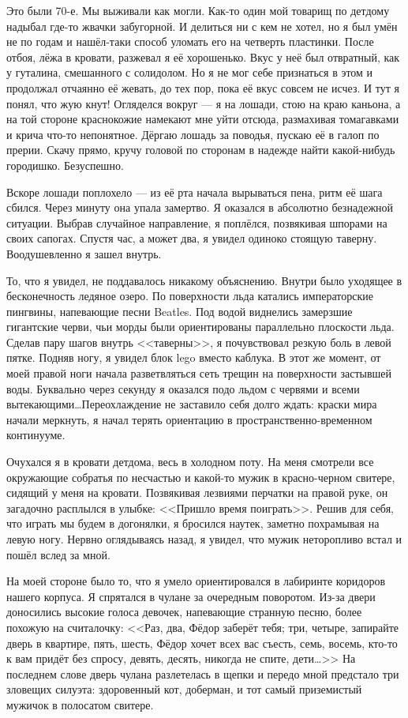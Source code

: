 Это были 70-е. Мы выживали как могли. Как-то один мой товарищ по детдому надыбал где-то жвачки забугорной. И делиться ни с кем не хотел, но я был умён не по годам и нашёл-таки способ уломать его на четверть пластинки. После отбоя, лёжа в кровати, разжевал я её хорошенько. Вкус у неё был отвратный, как у гуталина, смешанного с солидолом. Но я не мог себе признаться в этом и продолжал отчаянно её жевать, до тех пор, пока её вкус совсем не исчез. И тут я понял, что жую кнут! Огляделся вокруг --- я на лошади, стою на краю каньона, а на той стороне краснокожие намекают мне уйти отсюда, размахивая томагавками и крича что-то непонятное. Дёргаю лошадь за поводья, пускаю её в галоп по прерии. Скачу прямо, кручу головой по сторонам в надежде найти какой-нибудь городишко. Безуспешно.

Вскоре лошади поплохело --- из её рта начала вырываться пена, ритм её шага сбился. Через минуту она упала замертво. Я оказался в абсолютно безнадежной ситуации. Выбрав случайное направление, я поплёлся, позвякивая шпорами на своих сапогах. Спустя час, а может два, я увидел одиноко стоящую таверну. Воодушевленно я зашел внутрь.

То, что я увидел, не поддавалось никакому объяснению. Внутри было уходящее в бесконечность ледяное озеро. По поверхности льда катались императорские пингвины, напевающие песни Beatles. Под водой виднелись замерзшие гигантские черви, чьи морды были ориентированы параллельно плоскости льда. Сделав пару шагов внутрь <<таверны>>, я почувствовал резкую боль в левой пятке. Подняв ногу, я увидел блок lego вместо каблука. В этот же момент, от моей правой ноги начала разветвляться сеть трещин на поверхности застывшей воды. Буквально через секунду я оказался подо льдом с червями и всеми вытекающими\ldots Переохлаждение не заставило себя долго ждать: краски мира начали меркнуть, я начал терять ориентацию в пространственно-временном континууме.

Очухался я в кровати детдома, весь в холодном поту. На меня смотрели все окружающие собратья по несчастью и какой-то мужик в красно-черном свитере, сидящий у меня на кровати. Позвякивая лезвиями перчатки на правой руке, он загадочно расплылся в улыбке: <<Пришло время поиграть>>. Решив для себя, что играть мы будем в догонялки, я бросился наутек, заметно похрамывая на левую ногу. Нервно оглядываясь назад, я увидел, что мужик неторопливо встал и пошёл вслед за мной.

На моей стороне было то, что я умело ориентировался в лабиринте коридоров нашего корпуса. Я спрятался в чулане за очередным поворотом. Из-за двери доносились высокие голоса девочек, напевающие странную песню, более похожую на считалочку: <<Раз, два, Фёдор заберёт тебя; три, четыре, запирайте дверь в квартире, пять, шесть, Фёдор хочет всех вас съесть, семь, восемь, кто-то к вам придёт без спросу, девять, десять, никогда не спите, дети\ldots>> На последнем слове дверь чулана разлетелась в щепки и передо мной предстало три зловещих силуэта: здоровенный кот, доберман, и тот самый приземистый мужичок в полосатом свитере.

